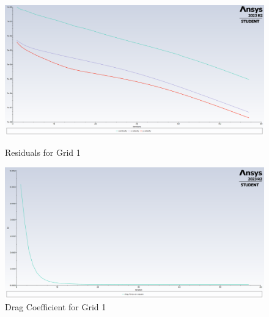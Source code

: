 \begin{figure}[H]
    \centering
    \begin{minipage}{0.45\textwidth}
        \centering
        \includegraphics[width=\textwidth]{Questions/Figures/residuals grid 1.png}
        \caption{Residuals for Grid 1}
        \label{fig:residuals_grid_1}
    \end{minipage}
    \begin{minipage}{0.45\textwidth}
        \centering
        \includegraphics[width=\textwidth]{Questions/Figures/drag force on square grid 1.png}
        \caption{Drag Coefficient for Grid 1}
        \label{fig:drag_coefficient_grid_1}
    \end{minipage}
\end{figure}
